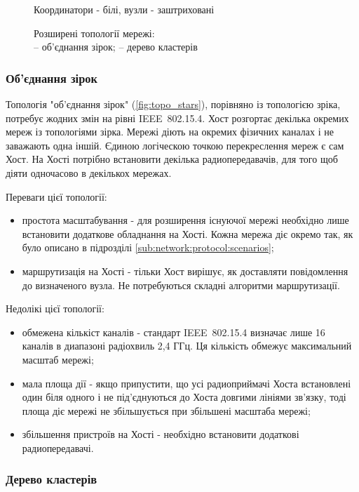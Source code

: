 \documentclass[a4paper,ukrainian,utf8,nocolumnsxix,floatsection,equationsection]{eskdtext}
\renewcommand\paragraph{\subsubsection}
\newcommand{\iee}[0]{IEEE~802.15.4\xspace}
\begin{document}
\begin{figure}[htb]
{{		}
	}
	\caption*{Координатори - білі, вузли - заштриховані}
	\caption{\label{fig:expansion:topologies}Розширені топології мережі:\\
		\protect{} -- об’єднання зірок; \protect{} -- дерево кластерів
	}
\end{figure}

\paragraph{Об’єднання зірок}

Топологія "об’єднання зірок" (\cref{fig:topo_stars}), порівняно із топологією зріка, потребує жодних змін на рівні \iee. Хост розгортає декілька окремих мереж із топологіями зірка. Мережі діють на окремих фізичних каналах і не заважають одна іншій. Єдиною логіческою точкою перекреслення мереж є сам Хост. На Хості потрібно встановити декілька радиопередавачів, для того щоб діяти одночасово в декількох мережах.

Переваги цієї топології:
\begin{itemize}
	\item простота масштабування - для розширення існуючої мережі необхідно лише встановити додаткове обладнання на Хості. Кожна мережа діє окремо так, як було описано в підрозділі \ref{sub:network:protocol:scenarios};
	\item маршрутизація на Хості - тільки Хост вирішує, як доставляти повідомлення до визначеного вузла. Не потребуються складні алгоритми маршрутизації.
\end{itemize}

Недолікі цієї топології:
\begin{itemize}
	\item обмежена кількіст каналів - стандарт \iee визначає лише 16 каналів в диапазоні радіохвиль 2,4 ГГц. Ця кількість обмежує максимальний масштаб мережі;
	\item мала площа дії - якщо припустити, що усі радиоприймачі Хоста встановлені один біля одного і не під’єднуються до Хоста довгими лініями зв’язку, тоді площа діє мережі не збільшується при збільшені масштаба мережі;
	\item збільшення пристроїв на Хості - необхідно встановити додаткові радиопередавачі.
\end{itemize}

\paragraph{Дерево кластерів}
\end{document}
